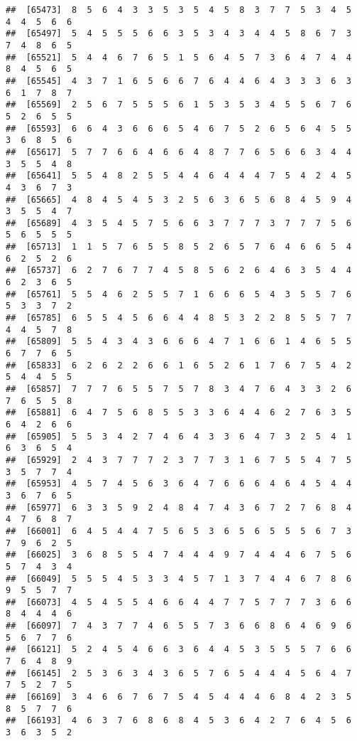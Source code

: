 \documentclass[
]{book}
\begin{document}
\begin{verbatim}
##  [65473]  8  5  6  4  3  3  5  3  5  4  5  8  3  7  7  5  3  4  5  4  4  5  6  6
##  [65497]  5  4  5  5  5  6  6  3  5  3  4  3  4  4  5  8  6  7  3  7  4  8  6  5
##  [65521]  5  4  4  6  7  6  5  1  5  6  4  5  7  3  6  4  7  4  4  8  4  5  6  5
##  [65545]  4  3  7  1  6  5  6  6  7  6  4  4  6  4  3  3  3  6  3  6  1  7  8  7
##  [65569]  2  5  6  7  5  5  5  6  1  5  3  5  3  4  5  5  6  7  6  5  2  6  5  5
##  [65593]  6  6  4  3  6  6  6  5  4  6  7  5  2  6  5  6  4  5  5  3  6  8  5  6
##  [65617]  5  7  7  6  6  4  6  6  4  8  7  7  6  5  6  6  3  4  4  3  5  5  4  8
##  [65641]  5  5  4  8  2  5  5  4  4  6  4  4  4  7  5  4  2  4  5  4  3  6  7  3
##  [65665]  4  8  4  5  4  5  3  2  5  6  3  6  5  6  8  4  5  9  4  3  5  5  4  7
##  [65689]  4  3  5  4  5  7  5  6  6  3  7  7  7  3  7  7  7  5  6  5  6  5  5  5
##  [65713]  1  1  5  7  6  5  5  8  5  2  6  5  7  6  4  6  6  5  4  6  2  5  2  6
##  [65737]  6  2  7  6  7  7  4  5  8  5  6  2  6  4  6  3  5  4  4  6  2  3  6  5
##  [65761]  5  5  4  6  2  5  5  7  1  6  6  6  5  4  3  5  5  7  6  5  3  3  7  2
##  [65785]  6  5  5  4  5  6  6  4  4  8  5  3  2  2  8  5  5  7  7  4  4  5  7  8
##  [65809]  5  5  4  3  4  3  6  6  6  4  7  1  6  6  1  4  6  5  5  6  7  7  6  5
##  [65833]  6  2  6  2  2  6  6  1  6  5  2  6  1  7  6  7  5  4  2  5  4  4  5  5
##  [65857]  7  7  7  6  5  5  7  5  7  8  3  4  7  6  4  3  3  2  6  7  6  5  5  8
##  [65881]  6  4  7  5  6  8  5  5  3  3  6  4  4  6  2  7  6  3  5  6  4  2  6  6
##  [65905]  5  5  3  4  2  7  4  6  4  3  3  6  4  7  3  2  5  4  1  6  3  6  5  4
##  [65929]  2  4  3  7  7  7  2  3  7  7  3  1  6  7  5  5  4  7  5  3  5  7  7  4
##  [65953]  4  5  7  4  5  6  3  6  4  7  6  6  6  4  6  4  5  4  4  3  6  7  6  5
##  [65977]  6  3  3  5  9  2  4  8  4  7  4  3  6  7  2  7  6  8  4  4  7  6  8  7
##  [66001]  6  4  5  4  4  7  5  6  5  3  6  5  6  5  5  5  6  7  3  7  9  6  2  5
##  [66025]  3  6  8  5  5  4  7  4  4  4  9  7  4  4  4  6  7  5  6  5  7  4  3  4
##  [66049]  5  5  5  4  5  3  3  4  5  7  1  3  7  4  4  6  7  8  6  9  5  5  7  7
##  [66073]  4  5  4  5  5  4  6  6  4  4  7  7  5  7  7  7  3  6  6  8  4  4  4  6
##  [66097]  7  4  3  7  7  4  6  5  5  7  3  6  6  8  6  4  6  9  6  5  6  7  7  6
##  [66121]  5  2  4  5  4  6  6  3  6  4  4  5  3  5  5  5  7  6  6  7  6  4  8  9
##  [66145]  2  5  3  6  3  4  3  6  5  7  6  5  4  4  4  5  6  4  7  7  5  2  7  5
##  [66169]  3  4  6  6  7  6  7  5  4  5  4  4  4  6  8  4  2  3  5  8  5  7  7  6
##  [66193]  4  6  3  7  6  8  6  8  4  5  3  6  4  2  7  6  4  5  6  3  6  3  5  2

\end{verbatim}
\end{document}
